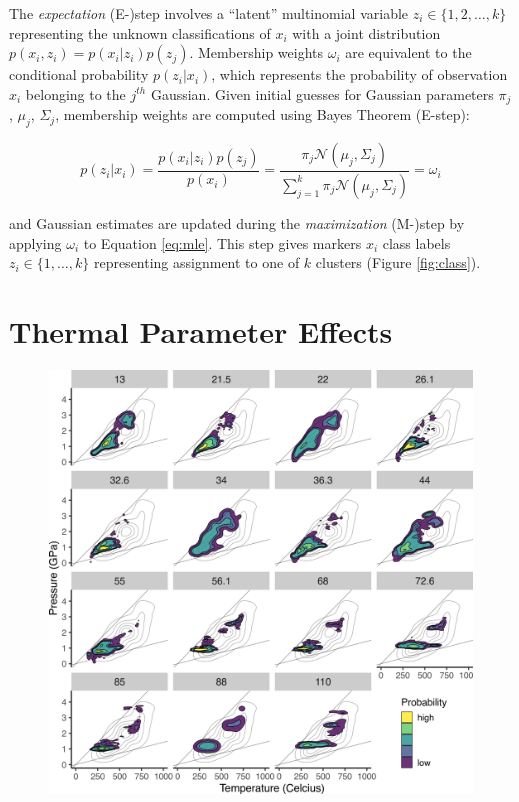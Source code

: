The \emph{expectation} (E-)step involves a ``latent'' multinomial variable \(z_{i} \in \{1, 2, \dots, k\}\) representing the unknown classifications of \(x_i\) with a joint distribution \(p(x_i,z_{i}) = p(x_i | z_{i})p(z_{j})\). Membership weights \(\omega_{i}\) are equivalent to the conditional probability \(p(z_{i} | x_i)\), which represents the probability of observation \(x_i\) belonging to the \(j^{th}\) Gaussian. Given initial guesses for Gaussian parameters \(\pi_j\), \(\mu_j\), \(\Sigma_j\), membership weights are computed using Bayes Theorem (E-step):

\begin{equation}
  p(z_{i} | x_i) = \frac{p(x_i | z_{i})p(z_{j})}{p(x_i)} = \frac{\pi_j \mathcal{N}(\mu_j, \Sigma_j)}{\sum_{j=1}^k \pi_j \mathcal{N}(\mu_j, \Sigma_j)} = \omega_{i}
  \label{eq:posterior}
\end{equation}

and Gaussian estimates are updated during the \emph{maximization} (M-)step by applying \(\omega_{i}\) to Equation \eqref{eq:mle}. This step gives markers \(x_i\) class labels \(z_i \in \{1, \dots, k\}\) representing assignment to one of \(k\) clusters (Figure \ref{fig:class}).

\hypertarget{thermal-parameter-effects}{%
\section{Thermal Parameter Effects}\label{thermal-parameter-effects}}



\begin{figure}[htbp]

{\centering \includegraphics[width=1\linewidth,]{assets/figs/chpt4/phiDensity} 

}

\end{figure}

